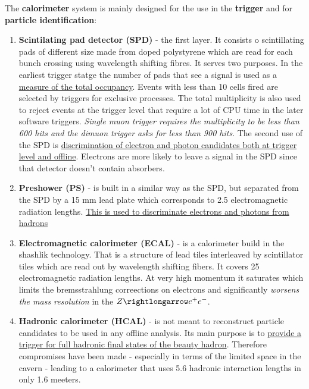 \documentclass[11pt,a4paper,twoside]{article}
\begin{document}
\begin{enumerate}
        The \textbf{calorimeter} system is mainly designed for the use in the \textbf{trigger} and for \textbf{particle identification}:
        \begin{enumerate}
            \item \textbf{Scintilating pad detector (SPD)} - the first layer. It consists o scintillating pads of different size made from doped polystyrene which are read for each bunch crossing using wavelength shifting fibres. It serves two purposes. In the earliest trigger statge the number of pads that see a signal is used as a \underline{measure of the total occupancy}. Events with less than 10 cells fired are selected by triggers for exclusive processes. The total multiplicity is also used to reject events at the trigger level that require a lot of CPU time in the later software triggers. \textit{Single muon trigger requires the multiplicity to be less than 600 hits and the dimuon trigger asks for less than 900 hits}. The second use of the SPD is \underline{discrimination of electron and photon candidates both at trigger level and offline}. Electrons are more likely to leave a signal in the SPD since that detector doesn't contain absorbers.
            
            \item \textbf{Preshower (PS)} - is built in a similar way as the SPD, but separated from the SPD by a 15 mm lead plate which corresponds to 2.5 electromagnetic radiation lengths. \underline{This is used to discriminate electrons and photons from hadrons}
            
            \item \textbf{Electromagnetic calorimeter (ECAL)} - is a calorimeter build in the shashlik technology. That is a structure of lead tiles interleaved by scintillator tiles which are read out by wavelength shifting fibers. It covers 25 electromagnetic radiation lengths. At very high momentum it saturates which limits the bremsstrahlung correections on electrons and significantly \textit{worsens the mass resolution} in the $Z \rightlongarrow e^{+} e^{-}$.
            
            \item \textbf{Hadronic calorimeter (HCAL)} - is not meant to reconstruct particle candidates to be used in any offline analysis. Its main purpose is to \underline{provide a trigger for full hadronic final states of the beauty hadron}. Therefore compromises have been made - especially in terms of the limited space in the cavern - leading to a calorimeter that uses 5.6 hadronic interaction lengths in only 1.6 meeters.
        \end{enumerate}


\end{enumerate}
\end{document}
